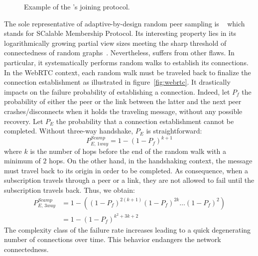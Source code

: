 \begin{figure*}
  \centering
  \hspace{8pt}
  \hspace{8pt}
  \caption{\label{fig:joiningexample}Example of the \SPRAY's joining
    protocol.}
\end{figure*}


The sole representative of adaptive-by-design random peer sampling is
\SCAMP~\cite{ganesh2001scamp,ganesh2003peer} which stands for
SCalable Membership Protocol. Its interesting property lies in its
logarithmically growing partial view sizes meeting the sharp threshold
of connectedness of random
graphs~\cite{erdos1959random}. Nevertheless, \SCAMP suffers from
other flaws. In particular, it systematically performs random walks to
establish its connections. In the WebRTC context, each random walk
must be traveled back to finalize the connection establishment as
illustrated in figure~\ref{fig:webrtc}. It drastically impacts on the
\SCAMP failure probability of establishing a connection. Indeed, let
$P_f$ the probability of either the peer or the link between the
latter and the next peer crashes/disconnects when it holds the
traveling message, without any possible recovery. Let $P_E$ the
probability that a connection establishment cannot be
completed. Without three-way handshake, $P_E$ is straightforward:
\begin{equation} P_{E,\,1way}^{Scamp}=1-(1- P_f)^{k+1} \end{equation} where $k$
is the number of hops before the end of the random walk with a minimum of $2$
hops. On the other hand, in the handshaking context, the message must travel
back to its origin in order to be completed. As consequence, when a
subscription travels through a peer or a link, they are not allowed to fail
until the subscription travels back. Thus, we obtain:
\begin{align} P_{E,\,3way}^{Scamp} &=1 - ((1-P_f)^{2(k+1)} (1-P_f)^{2k}
                                     \ldots (1-P_f)^2) \nonumber \\
                                   &=1-(1-P_f)^{k^2+3k+2}
\end{align}
The complexity class of the \SCAMP failure rate increases leading to a quick
degenerating number of connections over time. This behavior endangers the
network connectedness.

